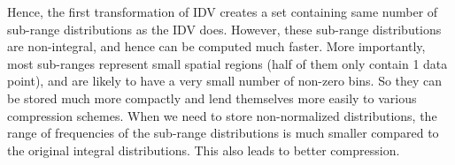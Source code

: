 Hence, the first transformation of IDV creates a set containing same number of sub-range distributions as the IDV does. However, these sub-range distributions are non-integral, and hence can be computed much faster. More importantly, most sub-ranges represent small spatial regions (half of them only contain 1 data point), and are likely to have a very small number of non-zero bins. So they can be stored much more compactly and lend themselves more easily to various compression schemes. When we need to store non-normalized distributions, the range of frequencies of the sub-range distributions is much smaller compared to the original integral distributions. This also leads to better compression.  
